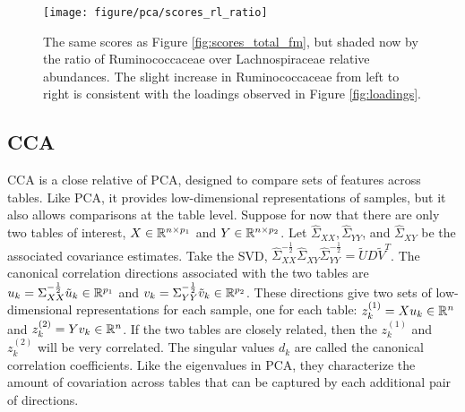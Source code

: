 \documentclass[14pt]{extarticle}
\begin{document}
\begin{figure}
  \centering
  \texttt{[image: figure/pca/scores\_rl\_ratio]}
  \caption{The same scores as Figure \ref{fig:scores_total_fm}, but shaded now by
    the ratio of Ruminococcaceae over Lachnospiraceae relative abundances. The
    slight increase in Ruminococcaceae from left to right is consistent with the
    loadings observed in Figure \ref{fig:loadings}.\label{fig:scores_rl_ratio} }
\end{figure}

\subsection{CCA}
\label{subsec:cca}

CCA is a close relative of PCA, designed to compare sets of features across
tables. Like PCA, it provides low-dimensional representations of samples, but it
also allows comparisons at the table level. Suppose for now that there are only
two tables of interest, $X \in \mathbb{R}^{n \times p_{1}}$ and $Y \in \mathbb{R}^{n
  \times p_{2}}$. Let $\hat{\Sigma}_{XX}, \hat{\Sigma}_{YY}$, and
$\hat{\Sigma}_{XY}$ be the associated covariance estimates. Take the SVD,
$\hat{\Sigma}_{XX}^{-\frac{1}{2}}\hat{\Sigma}_{XY}\hat{\Sigma}_{YY}^{-\frac{1}{2}}
= \tilde{U}D\tilde{V}^{T}$. The canonical correlation directions associated with
the two tables are $u_{k} = \Sigma_{XX}^{-\frac{1}{2}}\tilde{u}_{k} \in
\mathbb{R}^{p_{1}}$ and $v_{k} = \Sigma_{YY}^{-\frac{1}{2}}\tilde{v}_{k} \in
\mathbb{R}^{p_{2}}$. These directions give two sets of low-dimensional
representations for each sample, one for each table: $z_{k}^{(1)} = Xu_{k} \in
\mathbb{R}^{n}$ and $z_{k}^{(2)} = Yv_{k} \in \mathbb{R}^{n}$. If the two tables are
closely related, then the $z_{k}^{(1)}$ and $z_{k}^{(2)}$ will be very
correlated. The singular values $d_{k}$ are called the canonical correlation
coefficients. Like the eigenvalues in PCA, they characterize the amount of
covariation across tables that can be captured by each additional pair of
directions.
\end{document}
